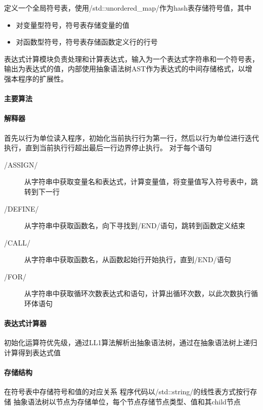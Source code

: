 \documentclass[UTF8]{ctexart}
\begin{document}
        定义一个全局符号表，使用\cppinline/std::unordered_map/作为hash表存储符号值，其中
        \begin{itemize}
          \item 对变量型符号，符号表存储变量的值
          \item 对函数型符号，符号表存储函数定义行的行号
        \end{itemize}

        表达式计算模块负责处理和计算表达式，输入为一个表达式字符串和一个符号表，输出为表达式的值，内部使用抽象语法树AST作为表达式的中间存储格式，以增强本程序的扩展性。

        \paragraph{主要算法}
          \paragraph{解释器}
          首先以行为单位读入程序，初始化当前执行行为第一行，然后以行为单位进行迭代执行，直到当前执行行超出最后一行边界停止执行。
          对于每个语句
            \begin{description}
              \item[\code/ASSIGN/]
              从字符串中获取变量名和表达式，计算变量值，将变量值写入符号表中，跳转到下一行
              \item[\code/DEFINE/]
              从字符串中获取函数名，向下寻找到\code/END/语句，跳转到函数定义结束
              \item[\code/CALL/]
              从字符串中获取函数名，从函数起始行开始执行，直到\code/END/语句
              \item[\code/FOR/]
              从字符串中获取循环次数表达式和语句，计算出循环次数，以此次数执行循环体语句
            \end{description}

        \paragraph{表达式计算器}
        初始化运算符优先级，通过LL1算法解析出抽象语法树，通过在抽象语法树上递归计算得到表达式值

        \paragraph{存储结构}
          在符号表中存储符号和值的对应关系
          程序代码以\cppinline/std::string/的线性表方式按行存储
          抽象语法树以节点为存储单位，每个节点存储节点类型、值和其child节点
\end{document}
